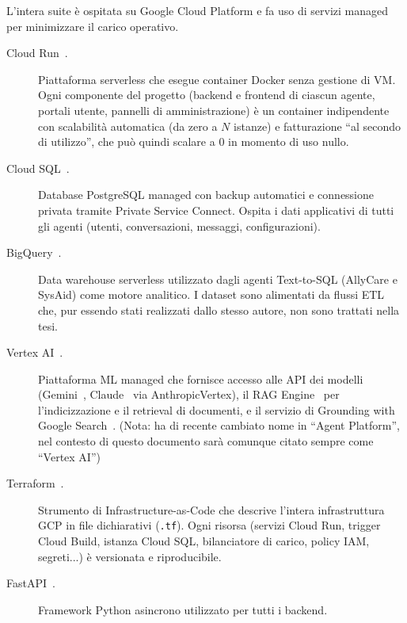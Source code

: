L'intera suite è ospitata su Google Cloud Platform e fa uso di servizi managed per minimizzare il carico operativo.

\begin{description}
  \item[Cloud Run~\cite{gcp_cloudrun}.] Piattaforma serverless che esegue container Docker senza gestione di VM. 
  Ogni componente del progetto (backend e frontend di ciascun agente, portali utente, pannelli di amministrazione) è un container indipendente 
  con scalabilità automatica (da zero a $N$ istanze) e fatturazione ``al secondo di utilizzo'', che può quindi scalare a 0 in momento di uso nullo.

  \item[Cloud SQL~\cite{gcp_cloudsql}.] Database PostgreSQL managed con backup automatici e connessione privata tramite Private Service Connect. 
  Ospita i dati applicativi di tutti gli agenti (utenti, conversazioni, messaggi, configurazioni).

  \item[BigQuery~\cite{gcp_bigquery}.] Data warehouse serverless utilizzato dagli agenti Text-to-SQL (AllyCare e SysAid) come motore analitico. 
  I dataset sono alimentati da flussi ETL che, pur essendo stati realizzati dallo stesso autore, non sono trattati nella tesi.

  \item[Vertex AI~\cite{gcp_vertexai}.] Piattaforma ML managed che fornisce accesso alle API dei modelli (Gemini~\cite{team2024gemini}, Claude~\cite{anthropic2024claude} via AnthropicVertex), 
  il RAG Engine~\cite{gcp_vertex_rag} per l'indicizzazione e il retrieval di documenti, e il servizio di Grounding with Google Search~\cite{gcp_grounding}.
  (Nota: ha di recente cambiato nome in ``Agent Platform'', nel contesto di questo documento sarà comunque citato sempre come ``Vertex AI'')

  \item[Terraform~\cite{terraform_docs}.] Strumento di Infrastructure-as-Code che descrive l'intera infrastruttura GCP in file dichiarativi (\texttt{.tf}). 
  Ogni risorsa (servizi Cloud Run, trigger Cloud Build, istanza Cloud SQL, bilanciatore di carico, policy IAM, segreti...) è versionata e riproducibile.

  \item[FastAPI~\cite{fastapi_docs}.] Framework Python asincrono utilizzato per tutti i backend. 

  
\end{description}

